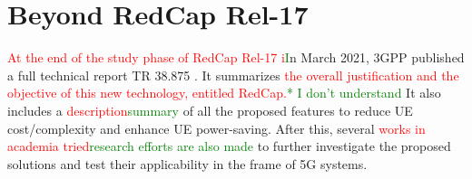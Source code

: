 \documentclass[]{IEEEtran}
\newcommand{\CAREPL}[2]{\textcolor{red}{#1}\textcolor{green}{#2}}
\begin{document}


\section{Beyond RedCap Rel-17}
\label{sec:7}



\CAREPL{At the end of the study phase of  RedCap Rel-17 i}{I}n March 2021, 3GPP published a full technical report TR 38.875 \cite{3gpp_study_2021_38.875}. 
It summarizes \CAREPL{the overall justification and the objective of this new technology, entitled RedCap.}{* I don't understand} 
It also includes a \CAREPL{description}{summary} of all the proposed features to reduce UE cost/complexity and enhance UE power-saving. After this, several \CAREPL{works in academia tried}{research efforts are also made} to further investigate the proposed solutions and test their applicability in the frame of 5G systems.
\end{document}
